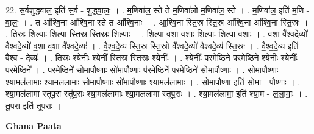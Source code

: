 \documentclass[17pt]{extarticle}
\begin{document}
22. स॒र्वशु॑द्धवाल॒ इति॑ स॒र्व - शु॒द्ध॒वा॒लः॒ । . म॒णिवा॑ल॒ स्ते ते म॒णिवा॑लो म॒णिवा॑ल॒ स्ते । . म॒णिवा॑ल॒ इति॑ म॒णि - वा॒लः॒ । . त आ᳚श्वि॒ना आ᳚श्वि॒ना स्ते त आ᳚श्वि॒नाः । . आ॒श्वि॒ना स्ति॒स्र स्ति॒स्र आ᳚श्वि॒ना आ᳚श्वि॒ना स्ति॒स्रः । . ति॒स्रः शि॒ल्पाः शि॒ल्पा स्ति॒स्र स्ति॒स्रः शि॒ल्पाः । . शि॒ल्पा व॒शा व॒शाः शि॒ल्पाः शि॒ल्पा व॒शाः । . व॒शा वै᳚श्वदे॒व्यो॑ वैश्वदे॒व्यो॑ व॒शा व॒शा वै᳚श्वदे॒व्यः॑ । . वै॒श्व॒दे॒व्य॑ स्ति॒स्र स्ति॒स्रो वै᳚श्वदे॒व्यो॑ वैश्वदे॒व्य॑ स्ति॒स्रः । . वै॒श्व॒दे॒व्य॑ इति॑ वैश्व - दे॒व्यः॑ । . ति॒स्रः श्येनीः॒ श्येनी᳚ स्ति॒स्र स्ति॒स्रः श्येनीः᳚ । . श्येनीः᳚ परमे॒ष्ठिने॑ परमे॒ष्ठिने॒ श्येनीः॒ श्येनीः᳚ परमे॒ष्ठिने᳚ । . प॒र॒मे॒ष्ठिने॑ सोमापौ॒ष्णाः सो॑मापौ॒ष्णाः प॑रमे॒ष्ठिने॑ परमे॒ष्ठिने॑ सोमापौ॒ष्णाः । . सो॒मा॒पौ॒ष्णाः श्या॒मल॑लामाः श्या॒मल॑लामाः सोमापौ॒ष्णाः सो॑मापौ॒ष्णाः श्या॒मल॑लामाः । . सो॒मा॒पौ॒ष्णा इति॑ सोमा - पौ॒ष्णाः । . श्या॒मल॑लामा स्तूप॒रा स्तू॑प॒राः श्या॒मल॑लामाः श्या॒मल॑लामा स्तूप॒राः । . श्या॒मल॑लामा॒ इति॑ श्या॒म - ल॒ला॒माः॒ । . तू॒प॒रा इति॑ तूप॒राः । \newline

\textbf{Ghana Paata } \newline
\end{document}

